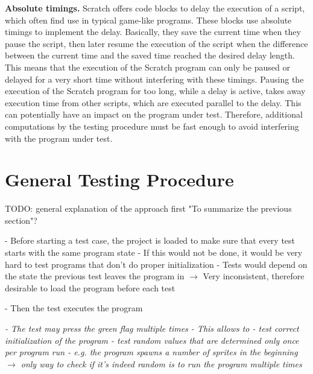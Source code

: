 \textbf{Absolute timings.}
Scratch offers code blocks to delay the execution of a script, which often find use in typical game-like programs.
These blocks use absolute timings to implement the delay.
Basically, they save the current time when they pause the script,
then later resume the execution of the script when the difference between the current time and the saved time reached the desired delay length.
This means that the execution of the Scratch program can only be paused or delayed for a very short time without interfering with these timings.
Pausing the execution of the Scratch program for too long, while a delay is active,
takes away execution time from other scripts, which are executed parallel to the delay.
This can potentially have an impact on the program under test.
Therefore, additional computations by the testing procedure must be fast enough to avoid interfering with the program under test.


\section{General Testing Procedure}

TODO: general explanation of the approach first
"To summarize the previous section"?

- Before starting a test case, the project is loaded to make sure that every test starts with the same program state
    - If this would not be done, it would be very hard to test programs that don't do proper initialization
    - Tests would depend on the state the previous test leaves the program in
    $\rightarrow$ Very inconsistent, therefore desirable to load the program before each test

- Then the test executes the program

\textit{- The test may press the green flag multiple times
- This allows to
    - test correct initialization of the program
    - test random values that are determined only once per program run
        - e.g. the program spawns a number of sprites in the beginning
        $\rightarrow$ only way to check if it's indeed random is to run the program multiple times
    }


